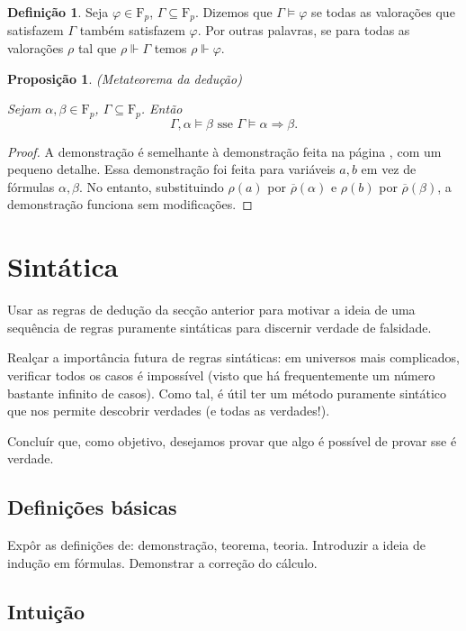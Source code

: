 \documentclass{report}
\newtheorem{prop}{Proposição}
\theoremstyle{definition}
\newtheorem{definicao}{Definição}
\theoremstyle{remark}
\newcommand{\F}{\mathrm{F}}
\begin{document}
	\begin{definicao}
	Seja $\varphi \in \F_p$, $\Gamma \subseteq \F_p$. Dizemos que $\Gamma \vDash \varphi$ se todas as valorações que satisfazem $\Gamma$ também satisfazem $\varphi$. Por outras palavras, se para todas as valorações $\rho$ tal que $\rho \Vdash \Gamma$ temos $\rho \Vdash \varphi$.
	\end{definicao}
	
	\begin{prop}
	(Metateorema da dedução)
	
	Sejam $\alpha, \beta \in \F_p$, $\Gamma \subseteq \F_p$. Então
	\[\Gamma, \alpha \vDash \beta \text{ sse } \Gamma \vDash \alpha \Rightarrow \beta.\]
	\end{prop}
	
	\begin{proof}
	A demonstração é semelhante à demonstração feita na página \pageref{dem:mtd}, com um pequeno detalhe. Essa demonstração foi feita para variáveis $a, b$ em vez de fórmulas $\alpha, \beta$. No entanto, substituindo $\rho(a)$ por $\overline\rho(\alpha)$ e $\rho(b)$ por $\overline\rho(\beta)$, a demonstração funciona sem modificações.
	\end{proof}
	
	\section{Sintática}
	
	Usar as regras de dedução da secção anterior para motivar a ideia de uma sequência de regras puramente sintáticas para discernir verdade de falsidade.
	
	Realçar a importância futura de regras sintáticas: em universos mais complicados, verificar todos os casos é impossível (visto que há frequentemente um número bastante infinito de casos). Como tal, é útil ter um método puramente sintático que nos permite descobrir verdades (e todas as verdades!).
	
	Concluír que, como objetivo, desejamos provar que algo é possível de provar sse é verdade.
	
	\subsection{Definições básicas}
	
	Expôr as definições de: demonstração, teorema, teoria. Introduzir a ideia de indução em fórmulas. Demonstrar a correção do cálculo.
	
	\subsection{Intuição}
	
\end{document}

